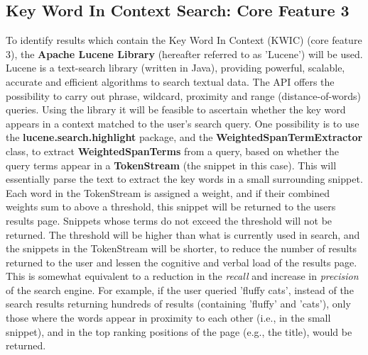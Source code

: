 \documentclass[a4paper, 10pt]{article}
\begin{document}
\subsection{Key Word In Context Search: Core Feature 3}\label{apache}
To identify results which contain the Key Word In Context (KWIC)\cite{kwic} (core feature 3), the \textbf{Apache Lucene Library} (hereafter referred to as 'Lucene') will be used. Lucene is a text-search library (written in Java), providing powerful, scalable, accurate and efficient algorithms to search textual data. The API offers the possibility to carry out phrase, wildcard, proximity and range (distance-of-words) queries. Using the library it will be feasible to ascertain whether the key word appears in a context matched to the user's search query. One possibility is to use the \textbf{lucene.search.highlight} package, and the \textbf{WeightedSpanTermExtractor} class, to extract \textbf{WeightedSpanTerms} from a query, based on whether the query terms appear in a \textbf{TokenStream} (the snippet in this case). This will essentially parse the text to extract the key words in a small surrounding snippet. Each word in the TokenStream is assigned a weight, and if their combined weights sum to above a threshold, this snippet will be returned to the users results page. Snippets whose terms do not exceed the threshold will not be returned. The threshold will be higher than what is currently used in search, and the snippets in the TokenStream will be shorter, to reduce the number of results returned to the user and lessen the cognitive and verbal load of the results page. This is somewhat equivalent to a reduction in the \textit{recall} and increase in \textit{precision} of the search engine. For example, if the user queried 'fluffy cats', instead of the search results returning hundreds of results (containing 'fluffy' and 'cats'), only those where the words appear in proximity to each other (i.e., in the small snippet), and in the top ranking positions of the page (e.g., the title), would be returned. 
\end{document}
